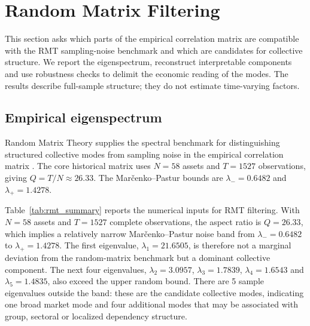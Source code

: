 \section{Random Matrix Filtering}
\label{sec:rmt}

This section asks which parts of the empirical correlation matrix are compatible with the RMT sampling-noise benchmark and which are candidates for collective structure. We report the eigenspectrum, reconstruct interpretable components and use robustness checks to delimit the economic reading of the modes. The results describe full-sample structure; they do not estimate time-varying factors.

\subsection{Empirical eigenspectrum}

Random Matrix Theory supplies the spectral benchmark for distinguishing structured collective modes from sampling noise in the empirical correlation matrix \cite{laloux_1999_noise,plerou_2002_random}. The core historical matrix uses $N=58$ assets and $T=1527$ observations, giving $Q=T/N\approx26.33$. The Mar\v{c}enko--Pastur bounds are $\lambda_-=0.6482$ and $\lambda_+=1.4278$.

\begin{center}
\label{tab:rmt_summary}
\end{center}
\GlobalPrecisionNote

Table~\ref{tab:rmt_summary} reports the numerical inputs for RMT filtering. With $N=58$ assets and $T=1527$ complete observations, the aspect ratio is $Q=26.33$, which implies a relatively narrow Mar\v{c}enko--Pastur noise band from $\lambda_-=0.6482$ to $\lambda_+=1.4278$. The first eigenvalue, $\lambda_1=21.6505$, is therefore not a marginal deviation from the random-matrix benchmark but a dominant collective component. The next four eigenvalues, $\lambda_2=3.0957$, $\lambda_3=1.7839$, $\lambda_4=1.6543$ and $\lambda_5=1.4835$, also exceed the upper random bound. There are 5 sample eigenvalues outside the band: these are the candidate collective modes, indicating one broad market mode and four additional modes that may be associated with group, sectoral or localized dependency structure.


